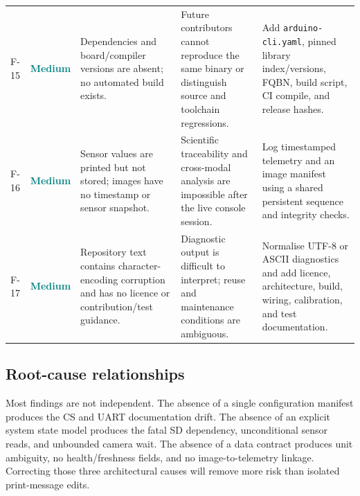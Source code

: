 \documentclass[11pt,a4paper]{article}
\newcommand{\code}[1]{\texttt{#1}}
\newcommand{\status}[2]{\textcolor{#1}{\textbf{#2}}}
\newcommand{\medium}{\status{teal}{Medium}}
\begin{document}
\begin{longtable}{P{0.07\textwidth}P{0.10\textwidth}P{0.21\textwidth}P{0.24\textwidth}P{0.25\textwidth}}
F-15 & \medium & Dependencies and board/compiler versions are absent; no automated build exists. & Future contributors cannot reproduce the same binary or distinguish source and toolchain regressions. & Add \code{arduino-cli.yaml}, pinned library index/versions, FQBN, build script, CI compile, and release hashes.\\
F-16 & \medium & Sensor values are printed but not stored; images have no timestamp or sensor snapshot. & Scientific traceability and cross-modal analysis are impossible after the live console session. & Log timestamped telemetry and an image manifest using a shared persistent sequence and integrity checks.\\
F-17 & \medium & Repository text contains character-encoding corruption and has no licence or contribution/test guidance. & Diagnostic output is difficult to interpret; reuse and maintenance conditions are ambiguous. & Normalise UTF-8 or ASCII diagnostics and add licence, architecture, build, wiring, calibration, and test documentation.\\
\bottomrule
\end{longtable}

\subsection{Root-cause relationships}

Most findings are not independent. The absence of a single configuration manifest produces the CS and UART documentation drift. The absence of an explicit system state model produces the fatal SD dependency, unconditional sensor reads, and unbounded camera wait. The absence of a data contract produces unit ambiguity, no health/freshness fields, and no image-to-telemetry linkage. Correcting those three architectural causes will remove more risk than isolated print-message edits.
\end{document}
